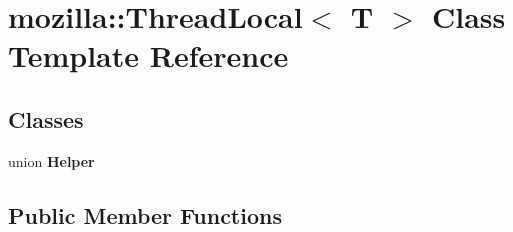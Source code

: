 \hypertarget{classmozilla_1_1_thread_local}{\section{mozilla\-:\-:Thread\-Local$<$ T $>$ Class Template Reference}
\label{classmozilla_1_1_thread_local}
}
\subsection*{Classes}
\begin{DoxyCompactItemize}
\item 
union {\bfseries Helper}
\end{DoxyCompactItemize}
\subsection*{Public Member Functions}
